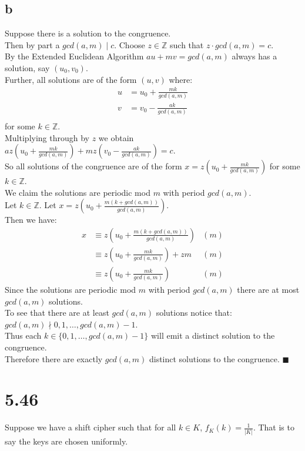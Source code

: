 \documentclass[letterpaper,12pt,oneside,onecolumn]{report}
\begin{document}
\subsection*{b}
Suppose there is a solution to the congruence.\\
Then by part a $gcd(a,m) \mid c$. Choose $z \in \mathbb{Z}$ such that $z\cdot gcd(a,m)=c$.\\
By the Extended Euclidean Algorithm $au + mv = gcd(a,m)$ always has a solution, say $(u_0, v_0)$.\\
Further, all solutions are of the form $(u,v)$ where:
\begin{align*}
u &= u_0 + \frac{mk}{gcd(a,m)}\\
v &= v_0 - \frac{ak}{gcd(a,m)}\\
\end{align*}
for some $k \in \mathbb{Z}$.\\
Multiplying through by $z$ we obtain $az(u_0 + \frac{mk}{gcd(a,m)}) + mz(v_0 - \frac{ak}{gcd(a,m)}) = c$.\\
So all solutions of the congruence are of the form $x = z(u_0 + \frac{mk}{gcd(a,m)})$ for some $k \in \mathbb{Z}$.\\
We claim the solutions are periodic mod $m$  with period $gcd(a,m)$.\\
Let $k \in \mathbb{Z}$. Let $x = z(u_0 + \frac{m(k + gcd(a,m))}{gcd(a,m)})$.\\
Then we have:
\begin{align*}
x &\equiv z(u_0 + \frac{m(k + gcd(a,m))}{gcd(a,m)}) &(m)\\
 &\equiv z(u_0 + \frac{mk}{gcd(a,m)}) + zm &(m)\\
 &\equiv z(u_0 + \frac{mk}{gcd(a,m)}) &(m)
\end{align*}
Since the solutions are periodic mod $m$ with period $gcd(a,m)$ there are at most $gcd(a,m)$ solutions.\\
To see that there are at least $gcd(a,m)$ solutions notice that:\\
$gcd(a,m) \nmid 0,1, \dots, gcd(a,m)-1$.\\
Thus each $k \in \{0,1, \dots, gcd(a,m)-1\}$ will emit a distinct solution to the congruence.\\
Therefore there are exactly $gcd(a,m)$ distinct solutions to the congruence. $\blacksquare$
\section*{5.46}
Suppose we have a shift cipher such that for all $k \in K$, $f_K(k) = \frac{1}{|K|}$. That is to say the keys are chosen uniformly.
\end{document}
